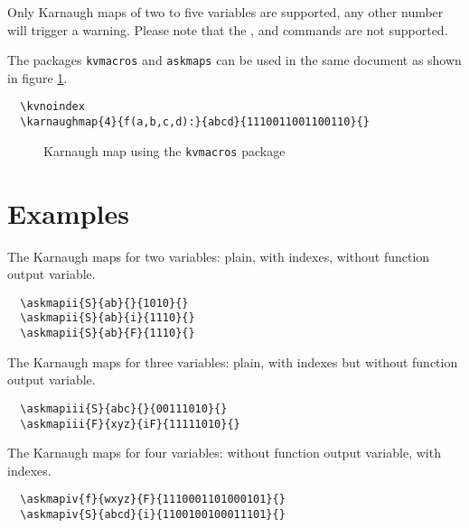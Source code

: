 \documentclass[a4paper,10pt]{ltxdoc}
\newcommand\Package[1]{\texttt{#1}}
\begin{document}
Only Karnaugh maps of two to five variables are supported, any other number
will trigger a warning. Please note that the , 
and  commands are not supported.
\medskip

The packages \Package{kvmacros} and \Package{askmaps} can be used in the same
document as shown in figure \ref{fig:karnaughmap}.
\begin{verbatim}
  \kvnoindex
  \karnaughmap{4}{f(a,b,c,d):}{abcd}{1110011001100110}{}
\end{verbatim}
\begin{figure}[H]
\centering
  \kvnoindex
\caption{Karnaugh map using the \Package{kvmacros} package}
\label{fig:karnaughmap}
\end{figure}

\newpage
\section{Examples}
\label{sec:examples}
\askmapunitlength=0.88cm
The Karnaugh maps for two variables: plain, with indexes, without function
output variable.
\begin{verbatim}
  \askmapii{S}{ab}{}{1010}{}
  \askmapii{S}{ab}{i}{1110}{}
  \askmapii{S}{ab}{F}{1110}{}
\end{verbatim}
\bigskip\bigskip

The Karnaugh maps for three variables: plain, with indexes but without function
output variable.
\begin{verbatim}
  \askmapiii{S}{abc}{}{00111010}{}
  \askmapiii{F}{xyz}{iF}{11111010}{}
\end{verbatim}
\bigskip\bigskip

The Karnaugh maps for four variables: without function output variable, with
indexes.
\begin{verbatim}
  \askmapiv{f}{wxyz}{F}{1110001101000101}{}
  \askmapiv{S}{abcd}{i}{1100100100011101}{}
\end{verbatim}
\bigskip\bigskip
\end{document}
